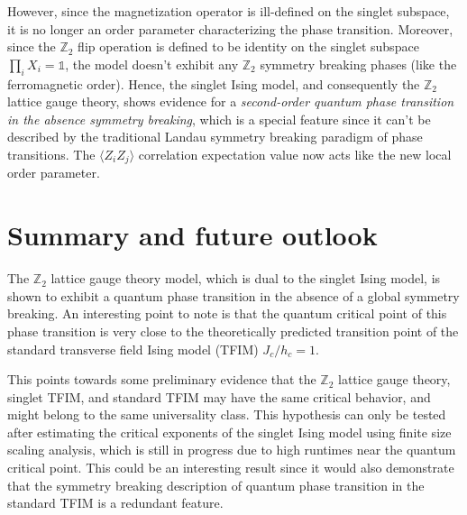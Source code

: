 \documentclass[../thesis_main.tex]{subfiles}
\begin{document}
However, since the magnetization operator is ill-defined on the singlet subspace, it is no longer an order parameter characterizing the phase transition. Moreover, since the $\mathbb{Z}_2$ flip operation is defined to be identity on the singlet subspace $\prod_i X_i = \mathds{1}$, the model doesn't exhibit any $\mathbb{Z}_2$ symmetry breaking phases (like the ferromagnetic order). Hence, the singlet Ising model, and consequently the $\mathbb{Z}_2$ lattice gauge theory, shows evidence for a \textit{second-order quantum phase transition in the absence symmetry breaking}, which is a special feature since it can't be described by the traditional Landau symmetry breaking paradigm of phase transitions. The $\langle Z_i Z_j\rangle$ correlation expectation value now acts like the new local order parameter. 

\section{Summary and future outlook}
The $\mathbb{Z}_2$ lattice gauge theory model, which is dual to the singlet Ising model, is shown to exhibit a quantum phase transition in the absence of a global symmetry breaking. An interesting point to note is that the quantum critical point of this phase transition is very close to the theoretically predicted transition point of the standard transverse field Ising model (TFIM) $J_c/h_c = 1$. 

This points towards some preliminary evidence that the $\mathbb{Z}_2$ lattice gauge theory, singlet TFIM, and standard TFIM may have the same critical behavior, and might belong to the same universality class. This hypothesis can only be tested after estimating the critical exponents of the singlet Ising model using finite size scaling analysis, which is still in progress due to high runtimes near the quantum critical point. This could be an interesting result since it would also demonstrate that the symmetry breaking description of quantum phase transition in the standard TFIM is a redundant feature.
\end{document}
